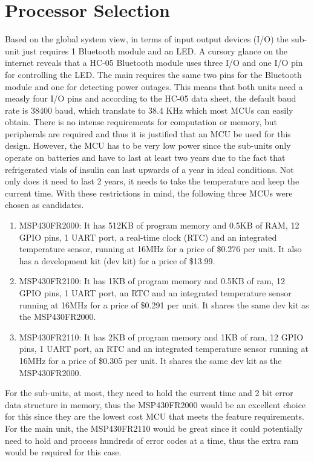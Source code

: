\section{Processor Selection}
Based on the global system view, in terms of input output devices (I/O) the sub-unit just requires 1 Bluetooth module and an LED. A cursory glance on the internet reveals that a HC-05 Bluetooth module\cite{InterfacingHC05Bluetooth} uses three I/O and one I/O pin for controlling the LED. The main requires the same two pins for the Bluetooth module and one for detecting power outages. This means that both units need a measly four I/O pins and according to the HC-05 data sheet, the default baud rate is 38400 baud, which translate to 38.4 KHz which most MCUs can easily obtain. There is no intense requirements for computation or memory, but peripherals are required and thus it is justified that an MCU be used for this design. However, the MCU has to be very low power since the sub-units only operate on batteries and have to last at least two years due to the fact that refrigerated vials of insulin can last upwards of a year in ideal conditions. Not only does it need to last 2 years, it needs to take the temperature and keep the current time. With these restrictions in mind, the following three MCUs were chosen as candidates.
\begin{enumerate}
  \item MSP430FR2000: It has 512KB of program memory and 0.5KB of RAM, 12 GPIO pins, 1 UART port, a real-time clock (RTC) and an integrated temperature sensor, running at 16MHz for a price of \$0.276 per unit. It also has a development kit (dev kit) for a price of \$13.99\cite{MSP430FR2000DataSheet}.
  \item MSP430FR2100: It has 1KB of program memory and 0.5KB of ram, 12 GPIO pins, 1 UART port, an RTC and an integrated temperature sensor running at 16MHz for a price of \$0.291 per unit. It shares the same dev kit as the MSP430FR2000\cite{MSP430FR2100DataSheet}.
  \item MSP430FR2110: It has 2KB of program memory and 1KB of ram, 12 GPIO pins, 1 UART port, an RTC and an integrated temperature sensor running at 16MHz for a price of \$0.305 per unit. It shares the same dev kit as the MSP430FR2000\cite{MSP430FR2110DataSheet}.
\end{enumerate}
For the sub-units, at most, they need to hold the current time and 2 bit error data structure in memory, thus the MSP430FR2000 would be an excellent choice for this since they are the lowest cost MCU that meets the feature requirements. For the main unit, the MSP430FR2110 would be great since it could potentially need to hold and process hundreds of error codes at a time, thus the extra ram would be required for this case.
